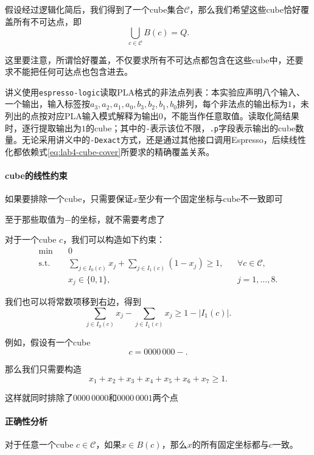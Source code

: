 假设经过逻辑化简后，我们得到了一个cube集合$\mathcal C$，那么我们希望这些cube恰好覆盖所有不可达点，即
\begin{equation}
\bigcup_{c\in\mathcal C}B(c)=Q.
\label{eq:lab4-cube-cover}
\end{equation}

这里要注意，所谓恰好覆盖，不仅要求所有不可达点都包含在这些cube中，还要求不能把任何可达点也包含进去。

讲义使用\texttt{espresso-logic}读取PLA格式的非法点列表：本实验应声明八个输入、一个输出，输入标签按$a_3,a_2,a_1,a_0,b_3,b_2,b_1,b_0$排列，每个非法点的输出标为$1$，未列出的点按对应PLA输入模式解释为输出$0$，不能当作任意取值。读取化简结果时，逐行提取输出为$1$的cube；其中的\texttt{-}表示该位不限，\texttt{.p}字段表示输出的cube数量。无论采用讲义中的\texttt{-Dexact}方式，还是通过其他接口调用Espresso，后续线性化都依赖式\eqref{eq:lab4-cube-cover}所要求的精确覆盖关系。


\paragraph{cube的线性约束}

如果要排除一个cube，只需要保证$x$至少有一个固定坐标与cube不一致即可

至于那些取值为$-$的坐标，就不需要考虑了

对于一个cube $c$，我们可以构造如下约束：
\begin{equation}
\begin{aligned}
\min\quad &0\\
\text{s.t.}\quad
&\sum_{j\in I_0(c)}x_j
+\sum_{j\in I_1(c)}(1-x_j)\ge1,
&&\forall c\in\mathcal C,\\
&x_j\in\{0,1\},
&&j=1,\ldots,8.
\end{aligned}
\label{eq:lab4-cube-model}
\end{equation}

我们也可以将常数项移到右边，得到
\[
\sum_{j\in I_0(c)}x_j-\sum_{j\in I_1(c)}x_j
\ge1-|I_1(c)|.
\]

例如，假设有一个cube
\[
c=0000\,000-.
\]

那么我们只需要构造
\[
x_1+x_2+x_3+x_4+x_5+x_6+x_7\ge1.
\]

这样就同时排除了$0000\,0000$和$0000\,0001$两个点

\paragraph{正确性分析}

对于任意一个cube $c\in\mathcal C$，如果$x\in B(c)$，那么$x$的所有固定坐标都与$c$一致。


